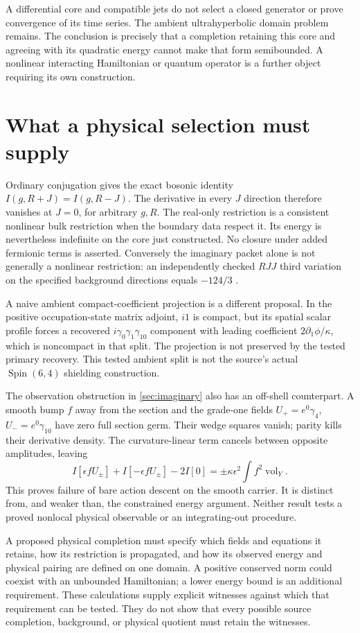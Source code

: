 A differential core and compatible jets do not select a closed generator
or prove convergence of its time series. The ambient ultrahyperbolic
domain problem remains. The conclusion is precisely that a completion
retaining this core and agreeing with its quadratic energy cannot make
that form semibounded. A nonlinear interacting Hamiltonian or quantum
operator is a further object requiring its own construction.

\section{What a physical selection must supply}
\label{sec:selection}

Ordinary conjugation gives the exact bosonic identity
$I(g,R+J)=I(g,R-J)$. The derivative in every $J$ direction therefore
vanishes at $J=0$, for arbitrary $g,R$.
The real-only restriction is a consistent nonlinear bulk restriction
when the boundary data respect it. Its energy is nevertheless indefinite
on the core just constructed. No closure under added fermionic terms is
asserted. Conversely the imaginary packet alone is not generally a
nonlinear restriction: an independently checked $RJJ$ third variation
on the specified background directions equals $-124/3$
\cite{RealReduction}.

A naive ambient compact-coefficient projection is a different proposal.
In the positive occupation-state matrix adjoint, $i1$ is compact, but its
spatial scalar profile forces a recovered
$i\gamma_0\gamma_1\gamma_{10}$ component with leading coefficient
$2\partial_1\phi/\kappa$, which is noncompact in that split.
The projection is not preserved by the tested primary recovery.
This tested ambient split is not the source's actual
$\operatorname{Spin}(6,4)$ shielding construction.

The observation obstruction in \cref{sec:imaginary} also has an off-shell
counterpart. A smooth bump $f$ away from the section and the grade-one
fields $U_+=e^0\gamma_4$, $U_-=e^0\gamma_{10}$ have zero full section
germ. Their wedge squares vanish; parity kills their derivative density.
The curvature-linear term cancels between opposite amplitudes, leaving
\begin{equation}
 I[\epsilon fU_\pm]+I[-\epsilon fU_\pm]-2I[0]
      =\pm\kappa\epsilon^2\int f^2\operatorname{vol}_Y.
 \label{eq:actiondescent}
\end{equation}
This proves failure of bare action descent on the smooth carrier.
It is distinct from, and weaker than, the constrained energy argument.
Neither result tests a proved nonlocal physical observable or an
integrating-out procedure.

A proposed physical completion must specify which fields and equations
it retains, how its restriction is propagated, and how its observed
energy and physical pairing are defined on one domain. A positive
conserved norm could coexist with an unbounded Hamiltonian; a lower energy
bound is an additional requirement. These calculations supply explicit
witnesses against which that requirement can be tested. They do not show
that every possible source completion, background, or physical quotient
must retain the witnesses.
